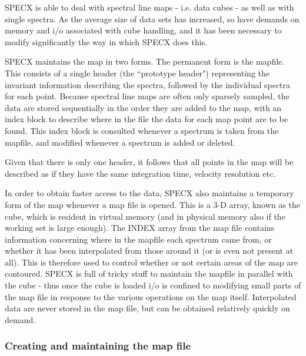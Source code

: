 \documentclass[11pt,twoside]{report}
\begin{document}
SPECX is able to deal with spectral line maps - i.e. data cubes - as well as with single spectra. As the average size of data sets has
increased, so have demands on memory and i/o associated with cube handling, and
it has been necessary to modify significantly the way in which SPECX does this.

SPECX maintains the map in two forms. The permanent form is the mapfile.
 This consists of a single header (the ``prototype header")
 representing the invariant information describing the
spectra, followed by the individual spectra for each point. Because spectral
line maps are often only sparsely sampled, the data are stored sequentially in
the order they are added to the map, with an index block  to describe where in the file the data for each map point are to be
found. This index block is consulted whenever a spectrum is taken from the
mapfile, and modified whenever a spectrum is added or deleted. 

Given that there is only one header, it follows that all points in the map will
be described as if they have the same integration time, velocity resolution
etc. 

In order to obtain faster access to the data, SPECX also maintains a temporary
form of the map whenever a map file is opened. This is a 3-D array, known as
the cube, which is resident in virtual memory (and in physical
memory also if the working set is large enough). The INDEX array from the map
file contains information concerning where in the mapfile each spectrum came
from, or whether it has been interpolated  from those
around it (or is even not present at all). This is therefore used to control
whether or not certain areas of the map are contoured. SPECX is full of tricky
stuff to maintain the mapfile in parallel with the cube - thus once the cube is
loaded i/o is confined to modifying small parts of the map file in response to
the various operations on the map itself. Interpolated data are never stored in
the map file, but can be obtained relatively quickly on demand. 

\subsubsection {Creating and maintaining the map file}
\end{document}
